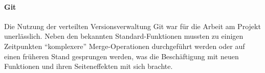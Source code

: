 		\paragraph{Git}
		Die Nutzung der verteilten Versionsverwaltung Git war für die Arbeit am Projekt unerlässlich. Neben den bekannten Standard-Funktionen mussten zu einigen Zeitpunkten "`komplexere"' Merge-Operationen durchgeführt werden oder auf einen früheren Stand gesprungen werden, was die Beschäftigung mit neuen Funktionen und ihren Seiteneffekten mit sich brachte.